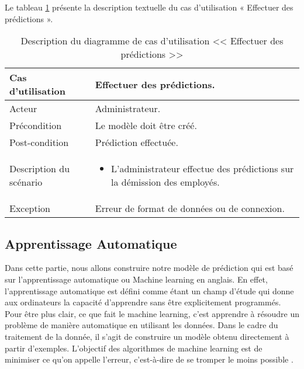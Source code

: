 Le tableau \ref{tab:effectuer_prediction} présente la description textuelle du cas d’utilisation « Effectuer des prédictions ».
\begin{longtable}[c]{
    |p{}
    |p{}|
}
    \caption{Description du diagramme de cas d’utilisation << Effectuer des prédictions >>}
    \label{tab:effectuer_prediction}\\
    \hline
    
    Cas d’utilisation
    & Effectuer des prédictions. \\
    \hline 
    
    Acteur
    & Administrateur. \\
    \hline 
    
    Précondition
    & Le modèle doit être créé. \\
    \hline
    
    Post-condition
    & Prédiction effectuée. \\
    \hline
    
    Description du
scénario

    &     \begin{itemize}

    \item L’administrateur effectue des prédictions sur la démission des employés.
    \end{itemize} \\
    \hline
    
   Exception
    & Erreur de format de données ou de connexion.
 \\ \hline
   
\end{longtable}












\subsection{Apprentissage Automatique}
Dans cette partie, nous allons construire notre modèle de prédiction qui est basé sur l'apprentissage automatique ou Machine learning en anglais.
En effet, l'apprentissage automatique est défini comme étant un champ d’étude qui donne aux ordinateurs la capacité d’apprendre sans être explicitement programmés. Pour être plus clair, ce que fait le machine learning, c’est apprendre à résoudre un problème de manière automatique en utilisant les données. Dans le cadre du traitement de la donnée, il s’agit de construire un modèle obtenu directement à partir d’exemples. L’objectif des algorithmes de machine learning est de minimiser ce qu’on appelle l’erreur, c’est-à-dire de se tromper le moins possible \cite{MachineLearning}.

